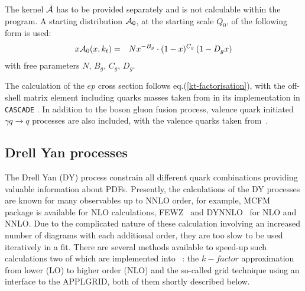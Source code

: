 The kernel ${\cal \tilde A}$ has to be provided separately and is not
 calculable within the program. A starting distribution  ${\cal A}_0$, 
 at the starting scale $Q_0$, of the following form is used:
\begin{eqnarray}
x{\cal A}_0(x,\kt) &=& N x^{-B_g} \cdot (1 -x)^{C_g}\left( 1 -D_g x\right) 
\label{a0}
\end{eqnarray}
with free parameters $N,\, B_g,\, C_g,\, D_g$. 

The calculation of the $ep$ cross section follows eq.(\ref{kt-factorisation}), 
with the off-shell matrix element including quarks masses taken from \cite{Catani:1990eg} 
in its implementation in {\tt CASCADE} \cite{Jung:2010si}.
In addition to the boson gluon fusion process, valence quark initiated 
$\gamma q\to q$ processes are also included, with the valence quarks taken from~\cite{Deak:2010gk}.


\subsection{Drell Yan processes}
\label{dysection}

The Drell Yan (DY) process constrain all different quark combinations
providing valuable information about PDFs.
%
Presently, the calculations of the DY processes are known for many observables up to 
NNLO order, for example, MCFM~\cite{MCFM} package is available for NLO calculations,
FEWZ~\cite{FEWZ} and DYNNLO~\cite{DYNNLO} for NLO and NNLO. Due to the complicated 
nature of these calculation involving an increased number of diagrams with each 
additional order, they are too slow to be used iteratively in a fit.
There are several methods available to speed-up such calculations two of which 
are implemented into \fitter\ : the $k-factor$ approximation from lower (LO) to higher order (NLO) 
and the so-called grid technique using an interface to the APPLGRID, both of them shortly
described below.  

